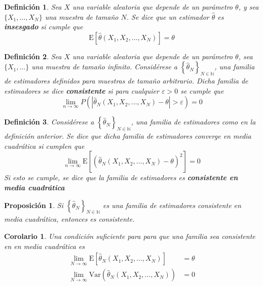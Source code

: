 \documentclass[12pt,letterpaper]{book}
\newtheorem{definicion}{Definición}[chapter]
\newtheorem{proposicion}[teorema]{Proposición}
\newtheorem{corolario}[teorema]{Corolario}
\newcommand{\N}{\mathbb{N}}
\newcommand{\E}[1]{\mathrm{E}\left[ #1 \right]}
\newcommand{\Var}[1]{\mathrm{Var}\left( #1 \right)}
\newcommand{\abso}[1]{\left| #1 \right|}
\begin{document}
\begin{definicion}
Sea $X$ una variable aleatoria que depende de un parámetro $\theta$, y sea $\{ X_1, \dots, X_N \}$ una muestra de tamaño $N$. Se dice que un estimador $\widehat{\theta}$ es \textbf{insesgado} si cumple que
\begin{equation}
\E{\widehat{\theta}(X_1,X_2,\dots,X_N)} = \theta
\end{equation}

\end{definicion}

\begin{definicion}
Sea $X$ una variable aleatoria que depende de un parámetro $\theta$, sea $\{ X_1, \dots\}$ una muestra de tamaño infinito.
%
Considérese a $\left\{ \widehat{\theta}_N \right\}_{N\in \N}$, una familia de estimadores definidos para muestras de tamaño arbitrario. 
%
Dicha familia de estimadores se dice \textbf{consistente} si para cualquier $\varepsilon > 0$ se cumple que
\begin{equation}
\lim_{n\rightarrow\infty} P\left( \abso{\widehat{\theta}_N(X_1,X_2,\dots,X_N)-\theta} > \varepsilon \right) = 0
\end{equation}
\end{definicion}

\begin{definicion}
Considérese a $\left\{ \widehat{\theta}_N \right\}_{N\in \N}$, una familia de estimadores como en la definición anterior.
%
Se dice que dicha familia de estimadores \textit{converge en media cuadrática} si cumplen que
\begin{equation}
\lim_{n\rightarrow\infty} \E{\left( \widehat{\theta}_N(X_1,X_2,\dots,X_N) - \theta \right)^{2}} = 0
\end{equation}
Si esto se cumple, se dice que la familia de estimadores es \textbf{consistente en media cuadrática} \end{definicion}

\begin{proposicion}
Si $\left\{ \widehat{\theta}_N \right\}_{N\in \N}$ es una familia de estimadores consistente en media cuadrática, entonces es consistente.
\end{proposicion}

\begin{corolario}
Una condición suficiente para para que una familia sea consistente en en media cuadrática es
\begin{align}
\lim_{N\rightarrow\infty} \E{\widehat{\theta}_N(X_1,X_2,\dots,X_N)} &= \theta \\
\lim_{N\rightarrow\infty} \Var{\widehat{\theta}_N(X_1,X_2,\dots,X_N)} &= 0
\end{align}
\end{corolario}
\end{document}
